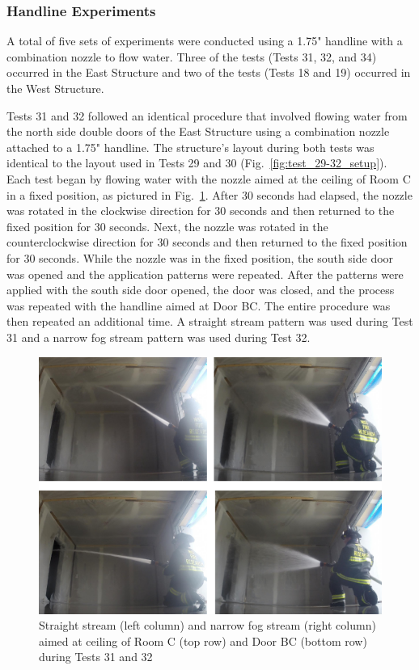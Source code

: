 \documentclass[12pt,oneside]{book}
\begin{document}
\clearpage

\subsubsection{Handline Experiments}
\label{sec:Water_Flow_Handline_Procedure}
A total of five sets of experiments were conducted using a 1.75" handline with a combination nozzle to flow water. Three of the tests (Tests 31, 32, and 34) occurred in the East Structure and two of the tests (Tests 18 and 19) occurred in the West Structure. 

Tests 31 and 32 followed an identical procedure that involved flowing water from the north side double doors of the East Structure using a combination nozzle attached to a 1.75" handline. The structure's layout during both tests was identical to the layout used in Tests 29 and 30 (Fig.~\ref{fig:test_29-32_setup}). Each test began by flowing water with the nozzle aimed at the ceiling of Room C in a fixed position, as pictured in Fig.~\ref{fig:test_31_32_pic}. After 30 seconds had elapsed, the nozzle was rotated in the clockwise direction for 30 seconds and then returned to the fixed position for 30 seconds. Next, the nozzle was rotated in the counterclockwise direction for 30 seconds and then returned to the fixed position for 30 seconds. While the nozzle was in the fixed position, the south side door was opened and the application patterns were repeated. After the patterns were applied with the south side door opened, the door was closed, and the process was repeated with the handline aimed at Door BC. The entire procedure was then repeated an additional time. A straight stream pattern was used during Test 31 and a narrow fog stream pattern was used during Test 32.

\begin{figure}[!ht]
\includegraphics[width=6in]{../Pictures/East_handline_C_BC.pdf}
\caption[Straight Stream and Narrow Fog Stream during Tests 31 and 32]{Straight stream (left column) and narrow fog stream (right column) aimed at ceiling of Room C (top row) and Door BC (bottom row) during Tests 31 and 32}
\label{fig:test_31_32_pic}
\end{figure}
\clearpage
\end{document}
